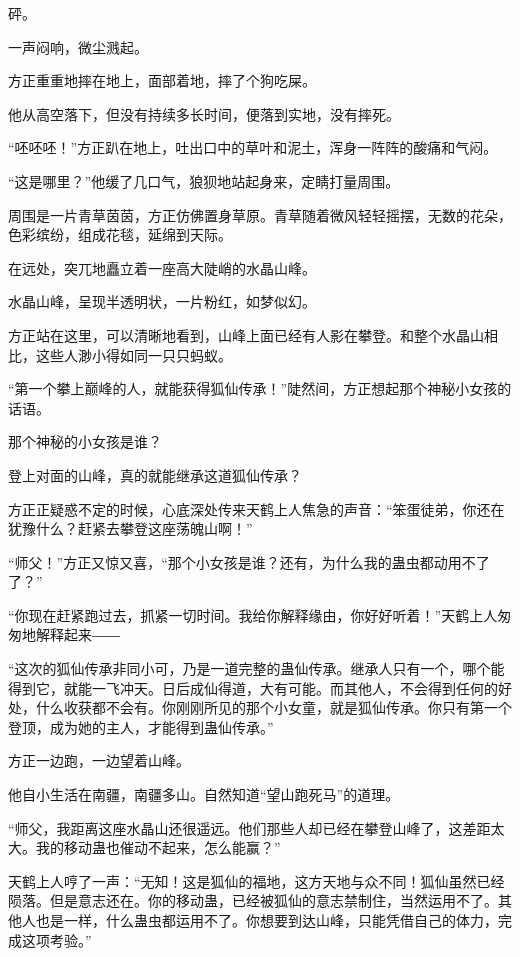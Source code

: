 
\begin{this_body}

砰。

一声闷响，微尘溅起。

方正重重地摔在地上，面部着地，摔了个狗吃屎。

他从高空落下，但没有持续多长时间，便落到实地，没有摔死。

“呸呸呸！”方正趴在地上，吐出口中的草叶和泥土，浑身一阵阵的酸痛和气闷。

“这是哪里？”他缓了几口气，狼狈地站起身来，定睛打量周围。

周围是一片青草茵茵，方正仿佛置身草原。青草随着微风轻轻摇摆，无数的花朵，色彩缤纷，组成花毯，延绵到天际。

在远处，突兀地矗立着一座高大陡峭的水晶山峰。

水晶山峰，呈现半透明状，一片粉红，如梦似幻。

方正站在这里，可以清晰地看到，山峰上面已经有人影在攀登。和整个水晶山相比，这些人渺小得如同一只只蚂蚁。

“第一个攀上巅峰的人，就能获得狐仙传承！”陡然间，方正想起那个神秘小女孩的话语。

那个神秘的小女孩是谁？

登上对面的山峰，真的就能继承这道狐仙传承？

方正正疑惑不定的时候，心底深处传来天鹤上人焦急的声音：“笨蛋徒弟，你还在犹豫什么？赶紧去攀登这座荡魄山啊！”

“师父！”方正又惊又喜，“那个小女孩是谁？还有，为什么我的蛊虫都动用不了了？”

“你现在赶紧跑过去，抓紧一切时间。我给你解释缘由，你好好听着！”天鹤上人匆匆地解释起来――

“这次的狐仙传承非同小可，乃是一道完整的蛊仙传承。继承人只有一个，哪个能得到它，就能一飞冲天。日后成仙得道，大有可能。而其他人，不会得到任何的好处，什么收获都不会有。你刚刚所见的那个小女童，就是狐仙传承。你只有第一个登顶，成为她的主人，才能得到蛊仙传承。”

方正一边跑，一边望着山峰。

他自小生活在南疆，南疆多山。自然知道“望山跑死马”的道理。

“师父，我距离这座水晶山还很遥远。他们那些人却已经在攀登山峰了，这差距太大。我的移动蛊也催动不起来，怎么能赢？”

天鹤上人哼了一声：“无知！这是狐仙的福地，这方天地与众不同！狐仙虽然已经陨落。但是意志还在。你的移动蛊，已经被狐仙的意志禁制住，当然运用不了。其他人也是一样，什么蛊虫都运用不了。你想要到达山峰，只能凭借自己的体力，完成这项考验。”


\end{this_body}
